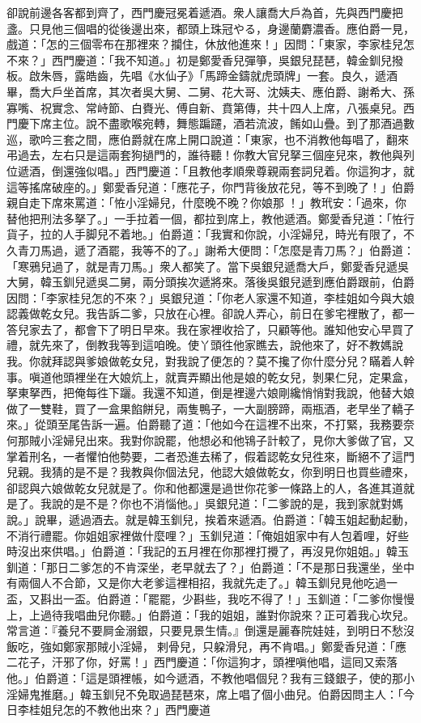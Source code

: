 卻說前邊各客都到齊了，西門慶冠冕着遞酒。衆人讓喬大戶為首，先與西門慶把盞。只見他三個唱的從後邊出來，都頭上珠冠やる，身邊蘭麝濃香。應伯爵一見，戲道：「怎的三個零布在那裡來？攔住，休放他進來！」因問：「東家，李家桂兒怎不來？」西門慶道：「我不知道。」初是鄭愛香兒彈箏，吳銀兒琵琶，韓金釧兒撥板。啟朱唇，露皓齒，先唱《水仙子》「馬蹄金鑄就虎頭牌」一套。{}良久，遞酒畢，喬大戶坐首席，其次者吳大舅、二舅、花大哥、沈姨夫、應伯爵、謝希大、孫寡嘴、祝實念、常峙節、白賚光、傅自新、賁第傳，共十四人上席，八張桌兒。西門慶下席主位。說不盡歌喉宛轉，舞態蹁躚，酒若流波，餚如山疊。到了那酒過數巡，歌吟三套之間，應伯爵就在席上開口說道：「東家，也不消教他每唱了，翻來弔過去，左右只是這兩套狗撾門的，誰待聽！你教大官兒拏三個座兒來，教他與列位遞酒，倒還強似唱。」西門慶道：「且教他孝順衆尊親兩套詞兒着。你這狗才，就這等搖席破座的。」鄭愛香兒道：「應花子，你門背後放花兒，等不到晚了！」伯爵親自走下席來罵道：「恠小淫婦兒，什麼晚不晚？你娘那𣭈！」教玳安：「過來，你替他把刑法多拏了。」一手拉着一個，都拉到席上，教他遞酒。鄭愛香兒道：「恠行貨子，拉的人手脚兒不着地。」伯爵道：「我實和你說，小淫婦兒，時光有限了，不久青刀馬過，遞了酒罷，我等不的了。」謝希大便問：「怎麼是青刀馬？」伯爵道：「寒鴉兒過了，就是青刀馬。」衆人都笑了。當下吳銀兒遞喬大戶，鄭愛香兒遞吳大舅，韓玉釧兒遞吳二舅，兩分頭挨次遞將來。落後吳銀兒遞到應伯爵跟前，伯爵因問：「李家桂兒怎的不來？」吳銀兒道：「你老人家還不知道，李桂姐如今與大娘認義做乾女兒。我告訴二爹，只放在心裡。卻說人弄心，前日在爹宅裡散了，都一答兒家去了，都會下了明日早來。我在家裡收拾了，只顧等他。誰知他安心早買了禮，就先來了，倒教我等到這咱晚。使丫頭徃他家瞧去，說他來了，好不教媽說我。你就拜認與爹娘做乾女兒，對我說了便怎的？莫不攙了你什麼分兒？瞞着人幹事。嗔道他頭裡坐在大娘炕上，就賣弄顯出他是娘的乾女兒，剝果仁兒，定果盒，拏東拏西，把俺每徃下躧。我還不知道，倒是裡邊六娘剛纔悄悄對我說，他替大娘做了一雙鞋，買了一盒果餡餅兒，兩隻鴨子，一大副膀蹄，兩瓶酒，老早坐了轎子來。」從頭至尾告訴一遍。伯爵聽了道：「他如今在這裡不出來，不打緊，我務要奈何那賊小淫婦兒出來。我對你說罷，他想必和他鴇子計較了，見你大爹做了官，又掌着刑名，一者懼怕他勢要，二者恐進去稀了，假着認乾女兒徃來，斷絕不了這門兒親。我猜的是不是？我教與你個法兒，他認大娘做乾女，你到明日也買些禮來，卻認與六娘做乾女兒就是了。你和他都還是過世你花爹一條路上的人，各進其道就是了。我說的是不是？你也不消惱他。」吳銀兒道：「二爹說的是，我到家就對媽說。」說畢，遞過酒去。就是韓玉釧兒，挨着來遞酒。伯爵道：「韓玉姐起動起動，不消行禮罷。你姐姐家裡做什麼哩？」玉釧兒道：「俺姐姐家中有人包着哩，好些時沒出來供唱。」伯爵道：「我記的五月裡在你那裡打攪了，再沒見你姐姐。」韓玉釧道：「那日二爹怎的不肯深坐，老早就去了？」伯爵道：「不是那日我還坐，坐中有兩個人不合節，又是你大老爹這裡相招，我就先走了。」韓玉釧兒見他吃過一盃，又斟出一盃。伯爵道：「罷罷，少斟些，我吃不得了！」玉釧道：「二爹你慢慢上，上過待我唱曲兒你聽。」伯爵道：「我的姐姐，誰對你說來？正可着我心坎兒。常言道：『養兒不要屙金溺銀，只要見景生情。』倒還是麗春院娃娃，到明日不愁沒飯吃，強如鄭家那賊小淫婦，𢱉剌骨兒，只躱滑兒，再不肯唱。」鄭愛香兒道：「應二花子，汗邪了你，好罵！」西門慶道：「你這狗才，頭裡嗔他唱，這囘又索落他。」伯爵道：「這是頭裡帳，如今遞酒，不教他唱個兒？我有三錢銀子，使的那小淫婦鬼推磨。」韓玉釧兒不免取過琵琶來，席上唱了個小曲兒。伯爵因問主人：「今日李桂姐兒怎的不教他出來？」西門慶道
